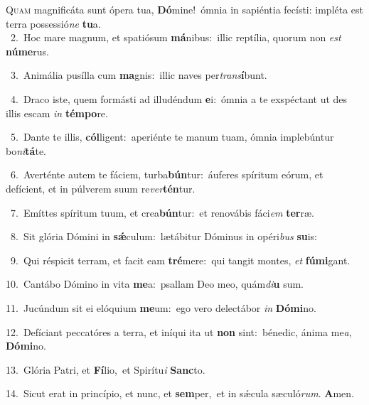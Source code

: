 \lettrine{\initial\textcolor{\initialcolor}{Q}}{uam} magnificáta sunt ópera tua, \textbf{Dó}\-mine!~\star ómnia in sapiéntia fecísti: impléta est terra possessió\textit{ne} \textbf{tu}\-a.\\
{\numbfont\textcolor{\numbcolor}{~2.}}~Hoc mare magnum, et spatiósum \textbf{má}\-nibus:~\star illic reptília, quorum non \textit{est} \textbf{nú}\-\textbf{me}rus.\par
{\numbfont\textcolor{\numbcolor}{~3.}}~Animália pusílla cum \textbf{ma}\-gnis:~\star illic naves per\-\textit{trans}\-\textbf{í}bunt.\par
{\numbfont\textcolor{\numbcolor}{~4.}}~Draco iste, quem formásti ad illudéndum \textbf{e}\-i:~\star ómnia a te exspéctant ut des illis escam \textit{in} \textbf{tém}\-\textbf{po}re.\par
{\numbfont\textcolor{\numbcolor}{~5.}}~Dante te illis, \textbf{cól}\-ligent:~\star aperiénte te manum tuam, ómnia implebúntur bo\-\textit{ni}\-\textbf{tá}te.\par
{\numbfont\textcolor{\numbcolor}{~6.}}~Averténte autem te fáciem, turba\-\textbf{bún}\-tur:~\star áuferes spíritum eórum, et defícient, et in púlverem suum re\-\textit{ver}\-\textbf{tén}tur.\par
{\numbfont\textcolor{\numbcolor}{~7.}}~Emíttes spíritum tuum, et crea\-\textbf{bún}\-tur:~\star et renovábis fáci\textit{em} \textbf{ter}\-ræ.\par
{\numbfont\textcolor{\numbcolor}{~8.}}~Sit glória Dómini in \textbf{sǽ}\-culum:~\star lætábitur Dóminus in opéri\textit{bus} \textbf{su}\-is:\par
{\numbfont\textcolor{\numbcolor}{~9.}}~Qui réspicit terram, et facit eam \textbf{tré}\-mere:~\star qui tangit montes, \textit{et} \textbf{fú}\-\textbf{mi}gant.\par
{\numbfont\textcolor{\numbcolor}{10.}}~Cantábo Dómino in vita \textbf{me}\-a:~\star psallam Deo meo, quám\-\textit{di}\-\textbf{u} sum.\par
{\numbfont\textcolor{\numbcolor}{11.}}~Jucúndum sit ei elóquium \textbf{me}\-um:~\star ego vero delectábor \textit{in} \textbf{Dó}\-\textbf{mi}no.\par
{\numbfont\textcolor{\numbcolor}{12.}}~Defíciant peccatóres a terra, et iníqui ita ut \textbf{non} sint:~\star bénedic, ánima me\-\textit{a}\-, \textbf{Dó}\-\textbf{mi}no.\par
{\numbfont\textcolor{\numbcolor}{13.}}~Glória Patri, et \textbf{Fí}\-lio,~\star et Spirítu\textit{i} \textbf{Sanc}\-to.\par
{\numbfont\textcolor{\numbcolor}{14.}}~Sicut erat in princípio, et nunc, et \textbf{sem}\-per,~\star et in sǽcula sæculó\-\textit{rum}\-. \textbf{A}\-men.\par
